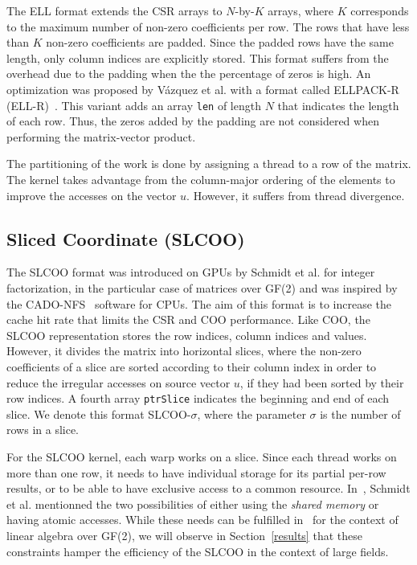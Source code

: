 \documentclass[runningheads,orivec]{llncs}
\begin{document}
The ELL format extends the CSR arrays to $N$-by-$K$ arrays, where $K$ corresponds to the maximum number of non-zero coefficients per row. The rows that have less than $K$ non-zero coefficients are padded. Since the padded rows have the same length, only column indices are explicitly stored. This format suffers from the overhead due to the padding when the the percentage of zeros is high. An optimization was proposed by V\'{a}zquez et al. with a format called ELLPACK-R (ELL-R)~\cite{VAZQ09}. This variant adds an array \texttt{len} of length $N$ that indicates the length of each row. Thus, the zeros added by the padding are not considered when performing the matrix-vector product.



The partitioning of the work is done by assigning a thread to a row of the matrix. The kernel takes advantage from the column-major ordering of the elements to improve the accesses on the vector $u$. However, it suffers from thread divergence. 


\vspace*{-0.25cm}

\subsection*{Sliced Coordinate (SLCOO)}
\vspace*{-0.25cm}

The SLCOO format was introduced on GPUs by Schmidt et al. for integer factorization, in the particular case of matrices over GF(2) \cite{SHMI11} and was inspired by the CADO-NFS~\cite{CADO} software for CPUs. The aim of this format is to increase the cache hit rate that limits the CSR and COO performance. 
Like COO, the SLCOO representation stores the row indices, column indices and values. However, it divides the matrix into horizontal slices, where the non-zero coefficients of a slice are sorted according to their column index in order to reduce the irregular accesses on source vector $u$, if they had been sorted by their row indices. A fourth array \texttt{ptrSlice} indicates the beginning and end of each slice. We denote this format SLCOO-$\sigma$, where the parameter $\sigma$ is the number of rows in a slice.






For the SLCOO kernel, each warp works on a slice. Since each thread works on more than one row, it needs to have individual storage for its partial per-row results, or to be able to have exclusive access to a common resource. In~\cite{SHMI11}, Schmidt et al. mentionned the two possibilities of either using the \textit{shared memory} or having atomic accesses. While these needs can be fulfilled in~\cite{SHMI11} for the context of linear algebra over GF(2), we will observe in Section~\ref{results} that these constraints hamper the efficiency of the SLCOO in the context of large fields.
\end{document}
